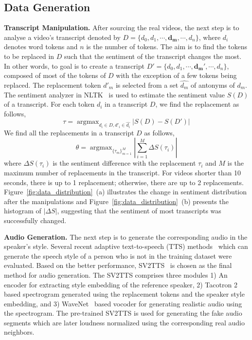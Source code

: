 \documentclass[conference, a4paper]{IEEEtran}
\DeclareMathOperator*{\argmax}{argmax}
\begin{document}
\subsection{Data Generation}
\noindent \textbf{Transcript Manipulation.} After sourcing the real videos, the next step is to analyse a video's transcript denoted by $D = \{d_0, d_1, \cdots, \boldsymbol{d_m}, \cdots, d_n\} $, where $d_i$ denotes word tokens and $n$ is the number of tokens. The aim is to find the tokens to be replaced in $D$ such that the sentiment of the transcript changes the most. In other words, to goal is to create a transcript $D' = \{d_0, d_1, \cdots, \boldsymbol{d_m'}, \cdots, d_n\}$, composed of most of the tokens of $D$ with the exception of a few tokens being replaced. The replacement token $d'_m$ is selected from a set $\hat{d_m}$ of antonyms of $d_m$. The sentiment analyzer in NLTK~\cite{bird_natural_2009} is used to estimate the sentiment value  $S(D)$ of a transcript. For each token $d_i$ in a transcript $D$, we find the replacement as follows,
$$\tau = \argmax_{d_i\in D, d'_i \in \hat{d_i}}|S(D)-S(D')|$$
We find all the replacements in a transcript $D$ as follows,
$$\theta = \argmax_{\{\tau_{m}\}_{m=1}^{M}}|\sum_{i=1}^{M}\Delta S(\tau_{i})|$$
where $\Delta S(\tau_{i})$ is the sentiment difference with the replacement $\tau_{i}$ and $M$ is the maximum number of replacements in the transcript. For videos shorter than 10 seconds, there is up to 1 replacement; otherwise, there are up to 2 replacements. Figure~\ref{fig:data_distribution}~(a) illustrates the change in sentiment distribution after the manipulations and Figure~\ref{fig:data_distribution}~(b) presents the histogram of $|\Delta S|$, suggesting that the sentiment of most transcripts was successfully changed.

\noindent \textbf{Audio Generation.} The next step is to generate the corresponding audio in the speaker’s style. Several recent adaptive text-to-speech (TTS)  methods~\cite{jia_transfer_2018, casanova_sc-glowtts_2021, neekhara_expressive_2021} which can generate the speech style of a person who is not in the training dataset were evaluated. Based on the better performance, SV2TTS~\cite{jia_transfer_2018} is chosen as the final method for audio generation. The SV2TTS comprises three modules 1) An encoder for extracting style embedding of the reference speaker, 2) Tacotron 2~\cite{shen_natural_2018} based spectrogram generated using the replacement tokens and the speaker style embedding, and 3) WaveNet~\cite{oord_wavenet_2016} based vocoder for generating realistic audio using the spectrogram. The pre-trained SV2TTS is used for generating the fake audio segments which are later loudness normalized using the corresponding real audio neighbors.
\end{document}
